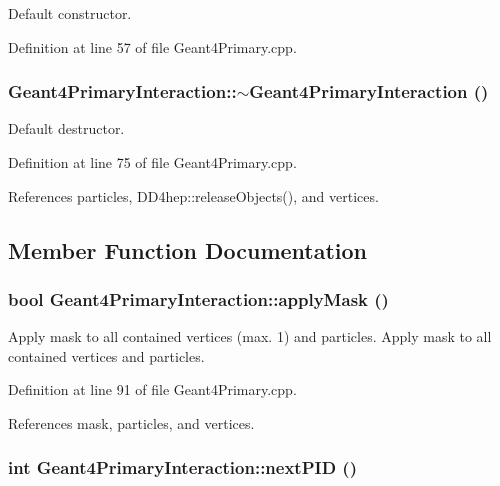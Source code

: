 Default constructor. 

Definition at line 57 of file Geant4Primary.cpp.\hypertarget{class_d_d4hep_1_1_simulation_1_1_geant4_primary_interaction_a8e8464271e737da64d13db8d0c926436}{
\subsubsection[{$\sim$Geant4PrimaryInteraction}]{\setlength{\rightskip}{0pt plus 5cm}Geant4PrimaryInteraction::$\sim$Geant4PrimaryInteraction ()}}
\label{class_d_d4hep_1_1_simulation_1_1_geant4_primary_interaction_a8e8464271e737da64d13db8d0c926436}


Default destructor. 

Definition at line 75 of file Geant4Primary.cpp.

References particles, DD4hep::releaseObjects(), and vertices.

\subsection{Member Function Documentation}
\hypertarget{class_d_d4hep_1_1_simulation_1_1_geant4_primary_interaction_adcf2faaa67296efa47035fb2c00719a6}{
\subsubsection[{applyMask}]{\setlength{\rightskip}{0pt plus 5cm}bool Geant4PrimaryInteraction::applyMask ()}}
\label{class_d_d4hep_1_1_simulation_1_1_geant4_primary_interaction_adcf2faaa67296efa47035fb2c00719a6}


Apply mask to all contained vertices (max. 1) and particles. Apply mask to all contained vertices and particles. 

Definition at line 91 of file Geant4Primary.cpp.

References mask, particles, and vertices.\hypertarget{class_d_d4hep_1_1_simulation_1_1_geant4_primary_interaction_a2edc81343a8d45ba50ea4ae95cb636c2}{
\subsubsection[{nextPID}]{\setlength{\rightskip}{0pt plus 5cm}int Geant4PrimaryInteraction::nextPID ()}}
\label{class_d_d4hep_1_1_simulation_1_1_geant4_primary_interaction_a2edc81343a8d45ba50ea4ae95cb636c2}


